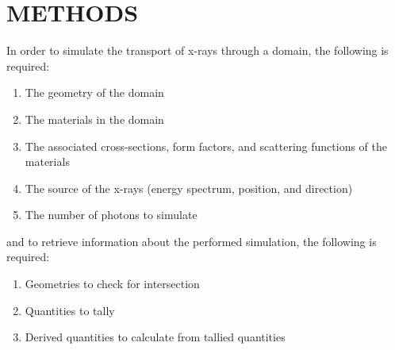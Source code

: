 \section{METHODS}

In order to simulate the transport of x-rays through a domain, the following is required:

\begin{enumerate}
    \item The geometry of the domain
    \item The materials in the domain
    \item The associated cross-sections, form factors, and scattering functions of the materials
    \item The source of the x-rays (energy spectrum, position, and direction)
    \item The number of photons to simulate
\end{enumerate}

and to retrieve information about the performed simulation, the following is required:

\begin{enumerate}
    \item Geometries to check for intersection
    \item Quantities to tally
    \item Derived quantities to calculate from tallied quantities
\end{enumerate}

